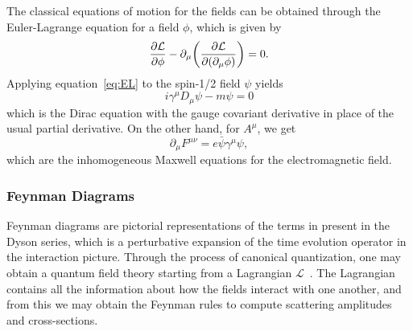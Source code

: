 The classical equations of motion for the fields can be obtained through the Euler-Lagrange equation for a field $\phi$, which is given by
\begin{equation}\label{eq:EL}
  \pdv{\mathcal{L}}{\phi}-\partial_\mu\pqty{\pdv{\mathcal{L}}{(\partial_\mu\phi)}}=0.
\end{equation}
Applying equation~\ref{eq:EL} to the spin-1/2 field $\psi$ yields
\begin{equation}
  i\gamma^\mu D_\mu\psi-m\psi=0
\end{equation}
which is the Dirac equation with the gauge covariant derivative in place of the usual partial derivative.
On the other hand, for $A^\mu$, we get
\begin{equation}
  \partial_\mu F^{\mu\nu}=e\bar{\psi}\gamma^\mu\psi,
\end{equation}
which are the inhomogeneous Maxwell equations for the electromagnetic field.

\subsubsection{Feynman Diagrams}

Feynman diagrams are pictorial representations of the terms in present in the Dyson series, which is a perturbative expansion of the time evolution operator in the interaction picture.
Through the process of canonical quantization, one may obtain a quantum field theory starting from a Lagrangian $\mathcal{L}$~\cite{Lancaster:1629337}.
The Lagrangian contains all the information about how the fields interact with one another, and from this we may obtain the Feynman rules to compute scattering amplitudes and cross-sections.


